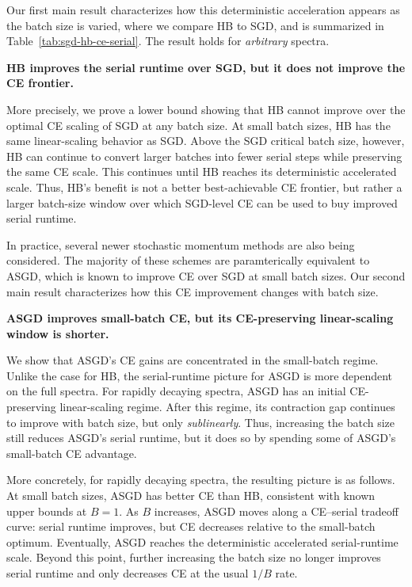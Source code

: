 \documentclass{article}
\begin{document}
Our first main result characterizes how this deterministic acceleration appears as the batch size is
varied, where we compare HB to SGD, and is summarized in Table~\ref{tab:sgd-hb-ce-serial}. The result holds for \emph{arbitrary} spectra.

\begin{center}
\textbf{HB improves the serial runtime over SGD, but it
does not improve the CE frontier.}
\end{center}

More precisely, we prove a lower bound showing that HB cannot improve over the
optimal CE scaling of SGD at any batch size. At small batch sizes, HB has the
same linear-scaling behavior as SGD. Above the SGD critical batch size, however,
HB can continue to convert larger batches into fewer serial steps while
preserving the same CE scale. This continues until HB reaches its deterministic
accelerated scale. Thus, HB's benefit is not a better best-achievable CE
frontier, but rather a larger batch-size window over which SGD-level CE can be
used to buy improved serial runtime.

In practice, several newer stochastic momentum methods are also being
considered. The majority of these schemes are paramterically
equivalent to ASGD, which is known to improve CE over SGD
at small batch sizes. Our second main result characterizes how this CE
improvement changes with batch size.

\begin{center}
\textbf{ASGD improves small-batch CE, but its CE-preserving linear-scaling
window is shorter.}
\end{center}

We show that ASGD's CE gains are concentrated in the small-batch regime. Unlike
the case for HB, the serial-runtime picture for ASGD is more dependent on the
full spectra. For rapidly decaying spectra, ASGD has an initial
CE-preserving linear-scaling regime. After this regime, its contraction gap
continues to improve with batch size, but only \emph{sublinearly}. Thus,
increasing the batch size still reduces ASGD's serial runtime, but it does so
by spending some of ASGD's small-batch CE advantage.

More concretely, for rapidly decaying spectra, the resulting picture is as follows. At small
batch sizes, ASGD has better CE than HB, consistent with known upper bounds at
\(B=1\). As \(B\) increases, ASGD moves along a CE--serial tradeoff curve:
serial runtime improves, but CE decreases relative to the small-batch optimum.
Eventually, ASGD reaches the deterministic accelerated serial-runtime scale.
Beyond this point, further increasing the batch size no longer improves serial
runtime and only decreases CE at the usual \(1/B\) rate. 
\end{document}
